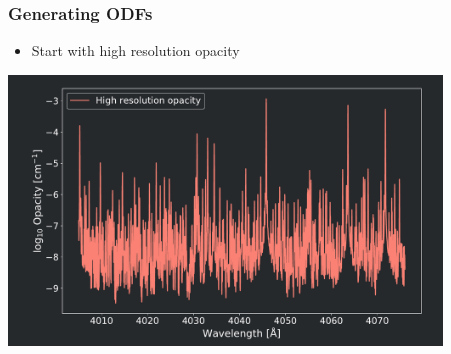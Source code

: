 %

\frame
{
	\frametitle{Generating ODFs}
	\begin{itemize}
    \item Start with high resolution opacity	
	\end{itemize}

	\centering
	\includegraphics[width=115mm]{images/odf_generation_process_0}
}

